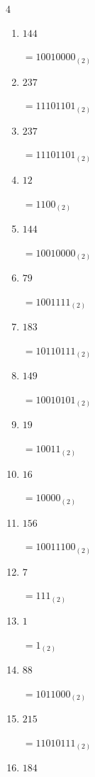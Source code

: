 \begin{multicols}{4}
\begin{enumerate}
        $=11101000_{(2)}$

\columnbreak %

  \item $144$

        $=10010000_{(2)}$

  \item $237$

        $=11101101_{(2)}$

  \item $237$

        $=11101101_{(2)}$

  \item $12$

        $=1100_{(2)}$

  \item $144$

        $=10010000_{(2)}$

  \item $79$

        $=1001111_{(2)}$

  \item $183$

        $=10110111_{(2)}$

  \item $149$

        $=10010101_{(2)}$

  \item $19$

        $=10011_{(2)}$

  \item $16$

        $=10000_{(2)}$

  \item $156$

        $=10011100_{(2)}$

  \item $7$

        $=111_{(2)}$

  \item $1$

        $=1_{(2)}$

  \item $88$

        $=1011000_{(2)}$

  \item $215$

        $=11010111_{(2)}$

\columnbreak %

  \item $184$


\end{enumerate}
\end{multicols}
